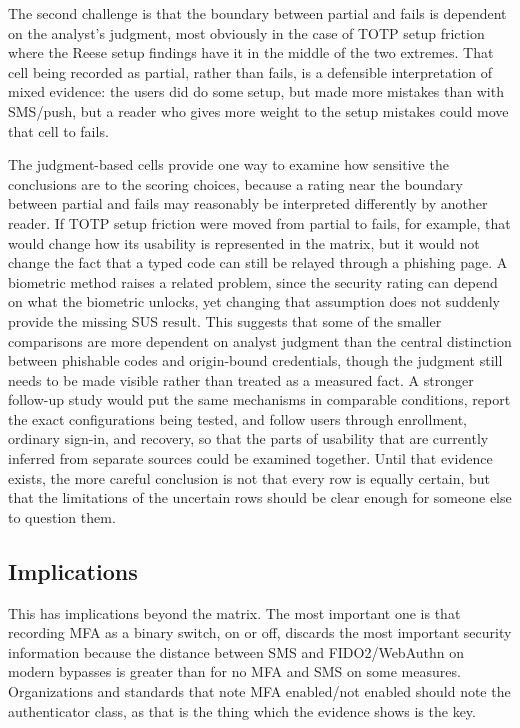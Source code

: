 \documentclass[sigconf]{acmart}
\begin{document}
The second challenge is that the boundary between partial and fails is dependent on the analyst's judgment, most obviously in the case of TOTP setup friction where the Reese setup findings have it in the middle of the two extremes. That cell being recorded as partial, rather than fails, is a defensible interpretation of mixed evidence: the users did do some setup, but made more mistakes than with SMS/push, but a reader who gives more weight to the setup mistakes could move that cell to fails. 

The judgment-based cells provide one way to examine how sensitive the conclusions are to the scoring choices, because a rating near the boundary between partial and fails may reasonably be interpreted differently by another reader. If TOTP setup friction were moved from partial to fails, for example, that would change how its usability is represented in the matrix, but it would not change the fact that a typed code can still be relayed through a phishing page. A biometric method raises a related problem, since the security rating can depend on what the biometric unlocks, yet changing that assumption does not suddenly provide the missing SUS result. This suggests that some of the smaller comparisons are more dependent on analyst judgment than the central distinction between phishable codes and origin-bound credentials, though the judgment still needs to be made visible rather than treated as a measured fact. A stronger follow-up study would put the same mechanisms in comparable conditions, report the exact configurations being tested, and follow users through enrollment, ordinary sign-in, and recovery, so that the parts of usability that are currently inferred from separate sources could be examined together. Until that evidence exists, the more careful conclusion is not that every row is equally certain, but that the limitations of the uncertain rows should be clear enough for someone else to question them.

\subsection{Implications}

This has implications beyond the matrix. The most important one is that recording MFA as a binary switch, on or off, discards the most important security information because the distance between SMS and FIDO2/WebAuthn on modern bypasses is greater than for no MFA and SMS on some measures. Organizations and standards that note MFA enabled/not enabled should note the authenticator class, as that is the thing which the evidence shows is the key.
\end{document}
